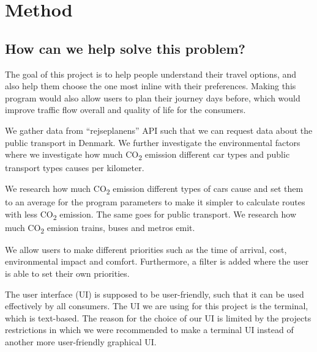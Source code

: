 \chapter{Method}\label{ch:method}


\section{How can we help solve this problem?}\label{sec:how-can-we-help-solve-this-problem?}

The goal of this project is to help people understand their travel options, and also help them choose the one most
inline with their preferences.
Making this program would also allow users to plan their journey days before, which would improve traffic flow
overall and quality of life for the consumers.

We gather data from ``rejseplanens'' API such that we can request data about the public transport in Denmark.
We further investigate the environmental factors where we investigate how much \unit{CO_{2}} emission
different car types and public transport types causes per kilometer.

We research how much \unit{CO_{2}} emission different types of cars cause and set them to an average for
the program parameters to make it simpler to calculate routes with less \unit{CO_{2}} emission.
The same goes for public transport.
We research how much \unit{CO_{2}} emission trains, buses and metros emit.

We allow users to make different priorities such as the time of arrival, cost, environmental impact and comfort.
Furthermore, a filter is added where the user is able to set their own priorities.

The user interface (UI) is supposed to be user-friendly, such that it can be used effectively by all
consumers.
The UI we are using for this project is the terminal, which is text-based.
The reason for the choice of our UI is limited by the projects restrictions in which we were recommended to make a
terminal UI instead of another more user-friendly graphical UI\@.




